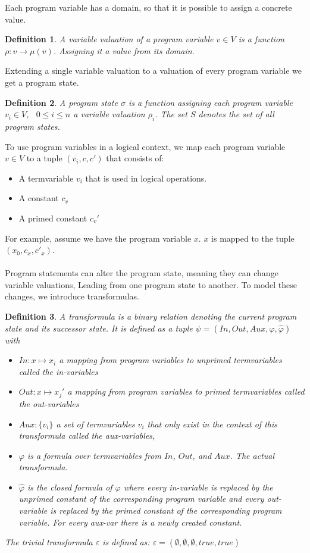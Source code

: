 \documentclass{article}
\newcommand{\tf}{\ensuremath{\varphi}\xspace}
\newcommand{\ctf}{\ensuremath{\widehat{\varphi}}\xspace}
\newcommand{\invars}{\ensuremath{In}\xspace}
\newcommand{\outvars}{\ensuremath{Out}\xspace}
\newcommand{\auxvars}{\ensuremath{Aux}\xspace}
\newtheorem{mydef}{Definition}
\begin{document}
Each program variable has a domain, so that it is possible to assign a concrete value.
\begin{mydef}
	A variable valuation of a program variable $v \in V$ is a function $\rho: v \rightarrow \mu(v)$.  Assigning it a value from its domain.
\end{mydef}
Extending a single variable valuation to a valuation of every program variable we get a program state.
\begin{mydef}
	A program state $\sigma$ is a function assigning each program variable $v_i \in V$, \ $0 \leq i \leq n$ a variable valuation $\rho_i$. The set $S$ denotes the set of all program states.
\end{mydef}
To use program variables in a logical context, we map each program variable $v \in V$ to a tuple $(v_i, c, c')$ that consists of: 
	\begin{itemize}
		\item A termvariable $v_i$ that is used in logical operations.
		\item A constant $c_v$
		\item A primed constant $c_v'$
\end{itemize}
For example, assume we have the program variable $x$. $x$ is mapped to the tuple $(x_0, c_x, c'_x)$.  \\ \\
Program statements can alter the program state, meaning they can change variable valuations, Leading from one program state to another. To model these changes, we introduce transformulas.
\begin{mydef}
	A transformula is a binary relation denoting the current program state and its successor state. It is defined as a tuple $\psi = (\invars, \outvars, \auxvars, \tf, \ctf)$ with 
	\begin{itemize}
		\item $\invars : x \mapsto x_i$ a mapping from program variables to unprimed termvariables called the in-variables
		\item $\outvars : x \mapsto x_j'$ a mapping from program variables to primed termvariables called the out-variables
		\item $\auxvars: \{ v_i \}$ a set of termvariables $v_i$ that only exist in the context of this transformula called the aux-variables,
		\item $\tf$ is a formula over termvariables from $\invars$, $\outvars$, and $\auxvars$. The actual transformula.
		\item $\ctf$ is the closed formula of $\tf$ where every in-variable is replaced by the unprimed constant of the corresponding program variable and every out-variable is replaced by the primed constant of the corresponding program variable. For every aux-var there is a newly created constant.
	\end{itemize}
The trivial transformula $\varepsilon$ is defined as: $\varepsilon = (\emptyset, \emptyset, \emptyset, true, true)$
\end{mydef}
%
\end{document}
